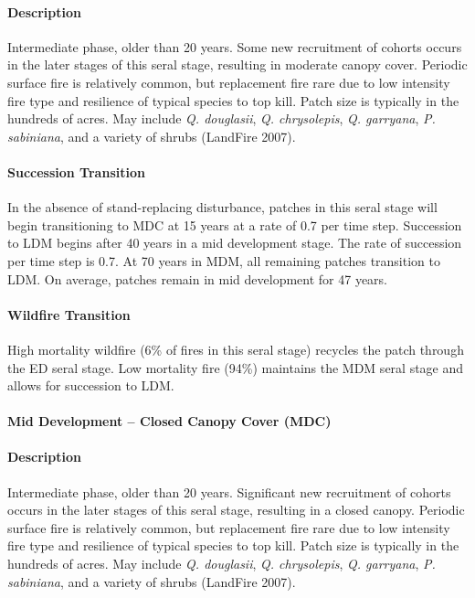 \paragraph{Description} Intermediate phase, older than 20 years. Some new recruitment of cohorts occurs in the later stages of this seral stage, resulting in moderate canopy cover. Periodic surface fire is relatively common, but replacement fire rare due to low intensity fire type and resilience of typical species to top kill. Patch size is typically in the hundreds of acres. May include \emph{Q. douglasii}, \emph{Q. chrysolepis}, \emph{Q. garryana}, \emph{P. sabiniana}, and a variety of shrubs (LandFire 2007).

\paragraph{Succession Transition} In the absence of stand-replacing disturbance, patches in this seral stage will begin transitioning to MDC at 15 years at a rate of 0.7 per time step. Succession to LDM begins after 40 years in a mid development stage. The rate of succession per time step is 0.7. At 70 years in MDM, all remaining patches transition to LDM. On average, patches remain in mid development for 47 years.

\paragraph{Wildfire Transition} High mortality wildfire (6\% of fires in this seral stage) recycles the patch through the ED seral stage. Low mortality fire (94\%) maintains the MDM seral stage and allows for succession to LDM.

\noindent\hrulefill

\paragraph{Mid Development – Closed Canopy Cover (MDC)}

\paragraph{Description} Intermediate phase, older than 20 years. Significant new recruitment of cohorts occurs in the later stages of this seral stage, resulting in a closed canopy. Periodic surface fire is relatively common, but replacement fire rare due to low intensity fire type and resilience of typical species to top kill. Patch size is typically in the hundreds of acres. May include \emph{Q. douglasii}, \emph{Q. chrysolepis}, \emph{Q. garryana}, \emph{P. sabiniana}, and a variety of shrubs (LandFire 2007).

